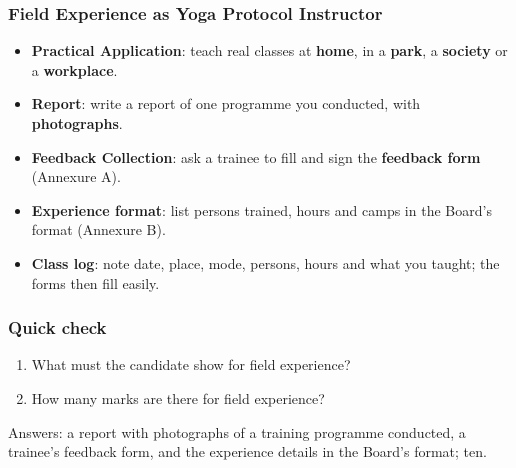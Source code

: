 \begin{frame}[fragile]\frametitle{Field Experience as Yoga Protocol Instructor}

      \begin{itemize}
        \item \textbf{Practical Application}: teach real classes at \textbf{home}, in a \textbf{park}, a \textbf{society} or a \textbf{workplace}.
        \item \textbf{Report}: write a report of one programme you conducted, with \textbf{photographs}.
        \item \textbf{Feedback Collection}: ask a trainee to fill and sign the \textbf{feedback form} (Annexure A).
        \item \textbf{Experience format}: list persons trained, hours and camps in the Board's format (Annexure B).
        \item \textbf{Class log}: note date, place, mode, persons, hours and what you taught; the forms then fill easily.
      \end{itemize}

\end{frame}

\begin{frame}[fragile]\frametitle{Quick check}
\begin{enumerate}
\item What must the candidate show for field experience?
\item How many marks are there for field experience?
\end{enumerate}
{\small Answers: a report with photographs of a training programme conducted, a trainee's feedback form, and the experience details in the Board's format; ten.}
\end{frame}
